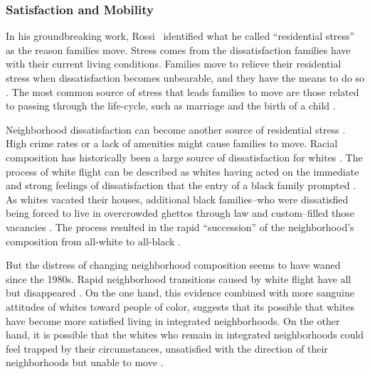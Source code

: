 \documentclass{baderart}
\newcommand{\TK}[1][]{\strong{TK #1}}
\begin{document}
\subsubsection{Satisfaction and Mobility}\label{satisfaction-and-mobility}

In his groundbreaking work, Rossi~\citeyearpar{rossi_why_1955} identified what he called ``residential stress'' as the reason families move. Stress comes from the dissatisfaction families have with their current living conditions. Families move to relieve their residential stress when dissatisfaction becomes unbearable, and they have the means to do so \citep{speare_residential_1974, speare_residential_1975}. The most common source of stress that leads families to move are those related to passing through the life-cycle, such as marriage and the birth of a child \citep{rossi_why_1955, clark_interpreting_2015, krysan_cycle_2017}. 

Neighborhood dissatisfaction can become another source of residential stress \citep{woldoff_effects_2002}. High crime rates or a lack of amenities might cause families to move. Racial composition has historically been a large source of dissatisfaction for whites \citep{crowder_racial_2000, crowder_spatial_2008}. The process of white flight can be described as whites having acted on the immediate and strong feelings of dissatisfaction that the entry of a black family prompted \citep{boustan_was_2010}. As whites vacated their houses, additional black families--who were dissatisfied being forced to live in overcrowded ghettos through law and custom--filled those vacancies \citep{sugrue_origins_1996, woldoff_white_2011}. The process resulted in the rapid ``succession'' of the neighborhood's composition from all-white to all-black \citep{duncan_negro_1957}.

But the distress of changing neighborhood composition seems to have waned since the 1980s. Rapid neighborhood transitions caused by white flight have all but disappeared \citep{ellen_sharing_2000, friedman_declines_2008, bader_fragmented_2016}. On the one hand, this evidence combined with more sanguine attitudes of whites toward people of color, suggests that its possible that whites have become more satisfied living in integrated neighborhoods. On the other hand, it is possible that the whites who remain in integrated neighborhoods could feel trapped by their circumstances, unsatisfied with the direction of their neighborhoods but unable to move \TK[SOUTH \& CROWDER?]. 
\end{document}
